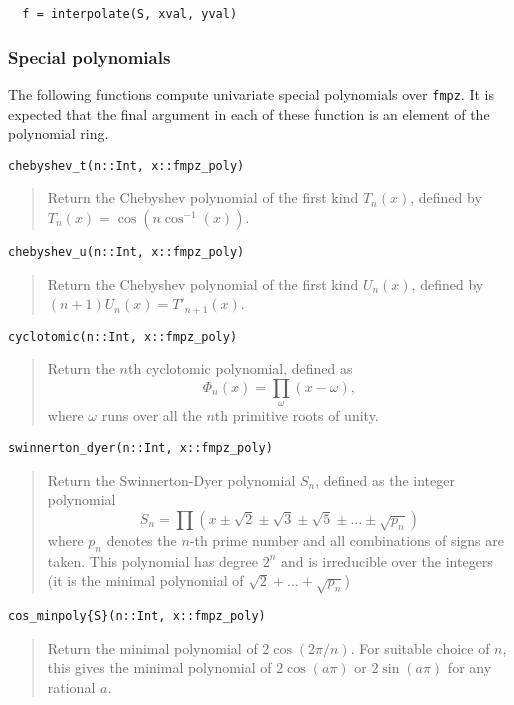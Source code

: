 \documentclass[a4paper,10pt]{article}
\newcommand{\code}{\lstinline}
\newcommand{\desc}[1]{\vspace{-3mm}\begin{quote}#1\end{quote}}
\begin{document}
{{\begin{lstlisting}
  f = interpolate(S, xval, yval)
\end{lstlisting}

\subsubsection{Special polynomials}

The following functions compute univariate special polynomials over \code{fmpz}. It is expected
that the final argument in each of these function is an element of the polynomial ring.

\begin{lstlisting}
chebyshev_t(n::Int, x::fmpz_poly)
\end{lstlisting}

\desc{Return the Chebyshev polynomial of the first kind $T_n(x)$, defined by 
$T_n(x) = \cos(n \cos^{-1}(x))$.}

\begin{lstlisting}
chebyshev_u(n::Int, x::fmpz_poly)
\end{lstlisting}

\desc{Return the Chebyshev polynomial of the first kind $U_n(x)$, defined by 
$(n+1) U_n(x) = T'_{n+1}(x)$.}

\begin{lstlisting}
cyclotomic(n::Int, x::fmpz_poly)
\end{lstlisting}

\desc{Return the $n$th cyclotomic polynomial, defined as
$$\Phi_n(x) = \prod_{\omega} (x-\omega),$$ where $\omega$ runs over all the 
$n$th primitive roots of unity.}

\begin{lstlisting}
swinnerton_dyer(n::Int, x::fmpz_poly)
\end{lstlisting}

\desc{Return the Swinnerton-Dyer polynomial $S_n$, defined as the integer 
polynomial $$S_n = \prod (x \pm \sqrt{2} \pm \sqrt{3}
\pm \sqrt{5} \pm \ldots \pm \sqrt{p_n})$$ where $p_n$ denotes the $n$-th prime 
number and all combinations of signs are taken. This polynomial has degree $2^n$
and is irreducible over the integers (it is the minimal polynomial of 
$\sqrt{2} + \ldots + \sqrt{p_n}$)}

\begin{lstlisting}
cos_minpoly{S}(n::Int, x::fmpz_poly)
\end{lstlisting}

\desc{Return the minimal polynomial of $2 \cos(2 \pi / n)$. For suitable choice of 
$n$, this gives the minimal polynomial of $2 \cos(a \pi)$ or $2 \sin(a \pi)$ for any
rational $a$.}

}}
\end{document}
